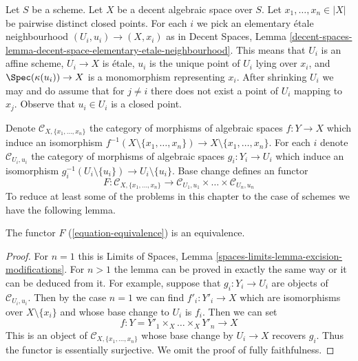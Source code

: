 \noindent
Let $S$ be a scheme. Let $X$ be a decent algebraic space over $S$.
Let $x_1, \ldots, x_n \in |X|$ be pairwise distinct closed points.
For each $i$ we pick an elementary \'etale neighbourhood
$(U_i, u_i) \to (X, x_i)$ as in Decent Spaces, Lemma
\ref{decent-spaces-lemma-decent-space-elementary-etale-neighbourhood}.
This means that $U_i$ is an affine scheme, $U_i \to X$ is \'etale,
$u_i$ is the unique point of $U_i$ lying over $x_i$, and
$\Spec(\kappa(u_i)) \to X$ is a monomorphism representing $x_i$.
After shrinking $U_i$ we may and do assume that for $j \not = i$
there does not exist a point of $U_i$ mapping to $x_j$.
Observe that $u_i \in U_i$ is a closed point.

\medskip\noindent
Denote $\mathcal{C}_{X, \{x_1, \ldots, x_n\}}$ the category of
morphisms of algebraic spaces $f : Y \to X$ which induce an isomorphism
$f^{-1}(X \setminus \{x_1, \ldots, x_n\}) \to X \setminus \{x_1, \ldots, x_n\}$.
For each $i$ denote $\mathcal{C}_{U_i, u_i}$ the category of
morphisms of algebraic spaces $g_i : Y_i \to U_i$ which induce an
isomorphism $g_i^{-1}(U_i \setminus \{u_i\}) \to U_i \setminus \{u_i\}$.
Base change defines an functor
\begin{equation}
\label{equation-equivalence}
F :
\mathcal{C}_{X, \{x_1, \ldots, x_n\}}
\longrightarrow
\mathcal{C}_{U_1, u_1} \times \ldots \times \mathcal{C}_{U_n, u_n}
\end{equation}
To reduce at least some of the problems in this chapter to the case
of schemes we have the following lemma.

\begin{lemma}
\label{lemma-equivalence}
The functor $F$ (\ref{equation-equivalence}) is an equivalence.
\end{lemma}

\begin{proof}
For $n = 1$ this is Limits of Spaces, Lemma
\ref{spaces-limits-lemma-excision-modifications}.
For $n > 1$ the lemma can be proved in exactly the same way or it
can be deduced from it. For example, suppose that
$g_i : Y_i \to U_i$ are objects of $\mathcal{C}_{U_i, u_i}$.
Then by the case $n = 1$ we can find $f'_i : Y'_i \to X$
which are isomorphisms over $X \setminus \{x_i\}$ and whose
base change to $U_i$ is $f_i$. Then we can set
$$
f : Y = Y'_1 \times_X \ldots \times_X Y'_n \to X
$$
This is an object of $\mathcal{C}_{X, \{x_1, \ldots, x_n\}}$
whose base change by $U_i \to X$ recovers $g_i$. Thus the functor
is essentially surjective. We omit the proof of
fully faithfulness.
\end{proof}

